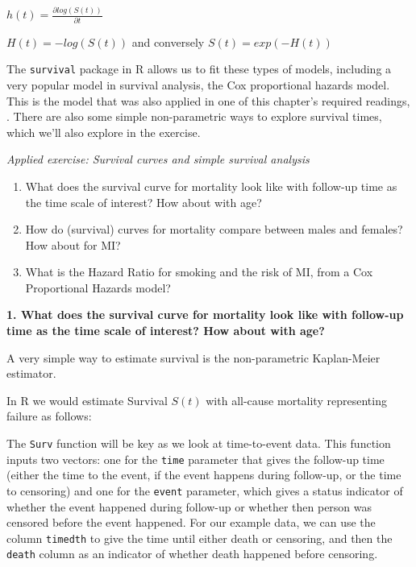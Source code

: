 \documentclass[
]{book}
\newenvironment{Shaded}{\begin{snugshade}}{\end{snugshade}}
\newcommand{\AttributeTok}[1]{\textcolor[rgb]{0.77,0.63,0.00}{#1}}
\newcommand{\FunctionTok}[1]{\textcolor[rgb]{0.00,0.00,0.00}{#1}}
\newcommand{\NormalTok}[1]{#1}
\newcommand{\OtherTok}[1]{\textcolor[rgb]{0.56,0.35,0.01}{#1}}
\newcommand{\SpecialCharTok}[1]{\textcolor[rgb]{0.00,0.00,0.00}{#1}}
\providecommand{\tightlist}{%
  \setlength{\itemsep}{0pt}\setlength{\parskip}{0pt}}
\begin{document}
\(h(t)=\frac{\partial log(S(t))}{\partial t}\)

\(H(t)=-log(S(t))\) and conversely \(S(t)=exp(-H(t))\)

The \texttt{survival} package in R allows us to fit these types of models, including a very popular model in survival analysis, the Cox proportional hazards model. This is the model that was also applied in one of this chapter's required readings, \citet{wong1989risk}. There are also some simple non-parametric ways to explore survival times, which we'll also explore in the exercise.

\emph{Applied exercise: Survival curves and simple survival analysis}

\begin{enumerate}
\def\labelenumi{\arabic{enumi}.}
\tightlist
\item
  What does the survival curve for mortality look like with follow-up time as the time scale of interest? How about with age?
\item
  How do (survival) curves for mortality compare between males and females? How about for MI?
\item
  What is the Hazard Ratio for smoking and the risk of MI, from a Cox Proportional Hazards model?
\end{enumerate}

\textbf{1. What does the survival curve for mortality look like with follow-up time as the time scale of interest? How about with age?}

A very simple way to estimate survival is the non-parametric Kaplan-Meier estimator.

In R we would estimate Survival \(S(t)\) with all-cause mortality representing failure as follows:

\begin{Shaded}
\end{Shaded}

The \texttt{Surv} function will be key as we look at time-to-event data. This function inputs two vectors: one for the \texttt{time} parameter that gives the follow-up time (either the time to the event, if the event happens during follow-up, or the time to censoring) and one for the \texttt{event} parameter, which gives a status indicator of whether the event happened during follow-up or whether then person was censored before the event happened. For our example data, we can use the column \texttt{timedth} to give the time until either death or censoring, and then the \texttt{death} column as an indicator of whether death happened before censoring.
\end{document}
